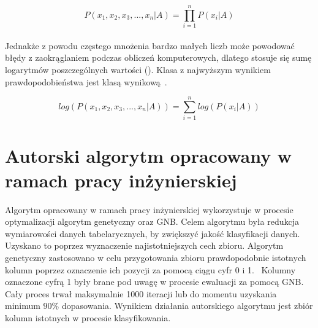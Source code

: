 \begin{equation}\label{math:gnb2}
P(x_1,x_2,x_3,...,x_n|A) = \prod_{i=1}^{n}P(x_i|A)
\end{equation}
\ \\
Jednakże z powodu częstego mnożenia bardzo małych liczb może powodować błędy z zaokrąglaniem podczas obliczeń komputerowych, dlatego stosuje się sumę logarytmów poszczególnych wartości (). Klasa z najwyższym wynikiem prawdopodobieństwa jest klasą wynikową~\cite{GNBalg}.

\begin{equation}\label{math:gnb3}
log(P(x_1,x_2,x_3,...,x_n|A)) = \sum_{i=1}^{n}log(P(x_i|A))
\end{equation}

\section{Autorski algorytm opracowany w ramach pracy inżynierskiej}
Algorytm opracowany w ramach pracy inżynierskiej wykorzystuje w procesie optymalizacji algorytm genetyczny oraz GNB. Celem algorytmu była redukcja wymiarowości danych tabelarycznych, by zwiększyć jakość klasyfikacji danych. Uzyskano to poprzez wyznaczenie najistotniejszych cech zbioru. Algorytm genetyczny zastosowano w celu przygotowania zbioru prawdopodobnie istotnych kolumn poprzez oznaczenie ich pozycji za pomocą ciągu cyfr 0 i 1.  \ Kolumny oznaczone cyfrą 1 były brane pod uwagę w procesie ewaluacji za pomocą GNB. Cały proces trwał maksymalnie 1000 iteracji lub do momentu uzyskania minimum $90\%$ dopasowania. Wynikiem działania autorskiego algorytmu jest zbiór kolumn istotnych w procesie klasyfikowania.


